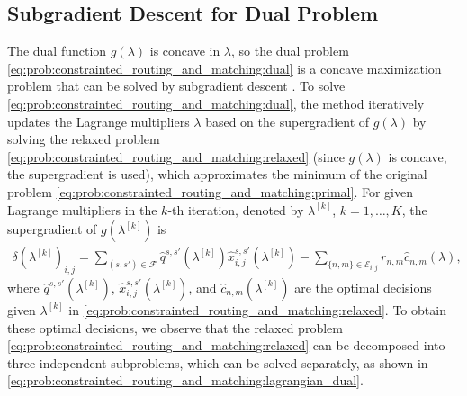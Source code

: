 \documentclass[journal]{IEEEtran}
\begin{document}
\subsection{Subgradient Descent for Dual Problem}\label{subsec:subgradient_descent}
The dual function $g(\lambda)$ is concave in $\lambda$, so the dual problem \eqref{eq:prob:constrainted_routing_and_matching:dual} is a concave maximization problem \cite{boyd2004convex} that can be solved by subgradient descent \cite{boyd2003subgradient}.
To solve \eqref{eq:prob:constrainted_routing_and_matching:dual}, the method iteratively updates the Lagrange multipliers $\lambda$ based on the supergradient of $g(\lambda)$ by solving the relaxed problem \eqref{eq:prob:constrainted_routing_and_matching:relaxed} (since $g(\lambda)$ is concave, the supergradient is used), which approximates the minimum of the original problem \eqref{eq:prob:constrainted_routing_and_matching:primal}.
For given Lagrange multipliers in the $k$-th iteration, denoted by $\lambda^{[k]}$, $k=1,\dots,K$, the supergradient of $g(\lambda^{[k]})$ is
\begin{equation}\label{eq:dual_function_subgradient}
  \begin{aligned}
   \delta(\lambda^{[k]})_{i,j}\!=\!\!\!
   \sum_{(s,s')\in\mathcal{F}}\!\!\! \hat{q}^{s,s'}(\lambda^{[k]}) \hat{x}^{s,s'}_{i,j}(\lambda^{[k]}) - \!\!\!\!\!\!\sum_{\{n,m\}\in\mathcal{E}_{i,j}} \!\!\!\!r_{n,m} \hat{c}_{n,m}(\lambda),
  \end{aligned}
\end{equation}
where $\hat{q}^{s,s'}(\lambda^{[k]})$, $\hat{x}^{s,s'}_{i,j}(\lambda^{[k]})$, and $\hat{c}_{n,m}(\lambda^{[k]})$ are the optimal decisions given $\lambda^{[k]}$ in \eqref{eq:prob:constrainted_routing_and_matching:relaxed}.
To obtain these optimal decisions, we observe that the relaxed problem \eqref{eq:prob:constrainted_routing_and_matching:relaxed} can be decomposed into three independent subproblems, which can be solved separately, as shown in \eqref{eq:prob:constrainted_routing_and_matching:lagrangian_dual}.
\end{document}
